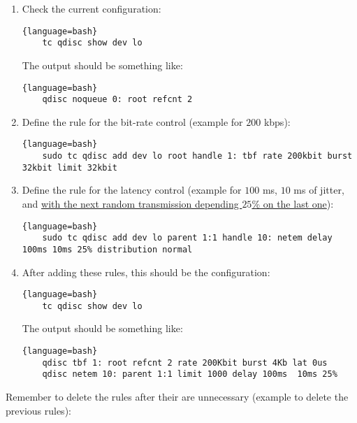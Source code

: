 \begin{enumerate}
\item Check the current configuration:
  
  \begin{lstlisting}{language=bash}
    tc qdisc show dev lo
  \end{lstlisting}
  
  The output should be something like:
  
  \begin{lstlisting}{language=bash}
    qdisc noqueue 0: root refcnt 2
  \end{lstlisting}
  
\item Define the rule for the bit-rate control (example for $200$ kbps):
  
  \begin{lstlisting}{language=bash}
    sudo tc qdisc add dev lo root handle 1: tbf rate 200kbit burst 32kbit limit 32kbit
  \end{lstlisting}
  
\item Define the rule for the latency control
  (example for $100$ ms, $10$ ms of jitter, and
  \href{https://wiki.linuxfoundation.org/networking/netem}{with the
    next random transmission depending $25$\% on the last one}):
  
  \begin{lstlisting}{language=bash}
    sudo tc qdisc add dev lo parent 1:1 handle 10: netem delay 100ms 10ms 25% distribution normal
  \end{lstlisting}
  
\item After adding these rules, this should be the configuration:
  
  \begin{lstlisting}{language=bash}
    tc qdisc show dev lo
  \end{lstlisting}
  
  The output should be something like:
  
  \begin{lstlisting}{language=bash}
    qdisc tbf 1: root refcnt 2 rate 200Kbit burst 4Kb lat 0us 
    qdisc netem 10: parent 1:1 limit 1000 delay 100ms  10ms 25%
  \end{lstlisting}

\end{enumerate}

Remember to delete the rules after their are unnecessary (example to delete the previous rules):

